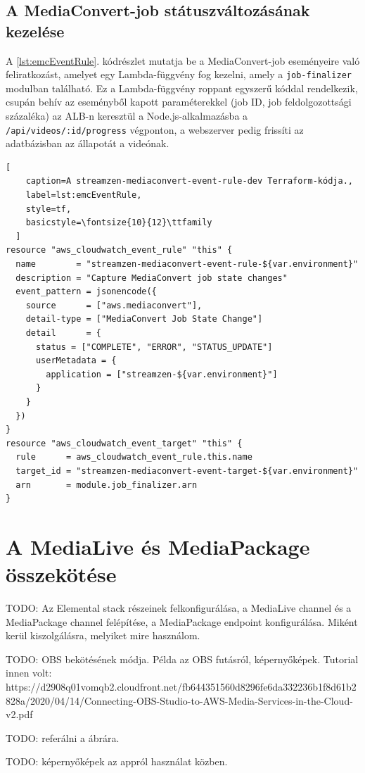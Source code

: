 \subsection{A MediaConvert-job státuszváltozásának kezelése}

A \ref{lst:emcEventRule}. kódrészlet mutatja be a MediaConvert-job eseményeire való feliratkozást, amelyet egy Lambda-függvény fog kezelni, amely a \verb|job-finalizer| modulban található. Ez a Lambda-függvény roppant egyszerű kóddal rendelkezik, csupán behív az eseményből kapott paraméterekkel (job ID, job feldolgozottsági százaléka) az ALB-n keresztül a Node.js-alkalmazásba a \verb|/api/videos/:id/progress| végponton, a webszerver pedig frissíti az adatbázisban az állapotát a videónak.

\begin{minipage}{0.92\textwidth}
  \begin{lstlisting}[
    caption=A streamzen-mediaconvert-event-rule-dev Terraform-kódja.,
    label=lst:emcEventRule,
    style=tf,
    basicstyle=\fontsize{10}{12}\ttfamily
  ]
resource "aws_cloudwatch_event_rule" "this" {
  name        = "streamzen-mediaconvert-event-rule-${var.environment}"
  description = "Capture MediaConvert job state changes"
  event_pattern = jsonencode({
    source      = ["aws.mediaconvert"],
    detail-type = ["MediaConvert Job State Change"]
    detail      = {
      status = ["COMPLETE", "ERROR", "STATUS_UPDATE"]
      userMetadata = {
        application = ["streamzen-${var.environment}"]
      }
    }
  })
}
resource "aws_cloudwatch_event_target" "this" {
  rule      = aws_cloudwatch_event_rule.this.name
  target_id = "streamzen-mediaconvert-event-target-${var.environment}"
  arn       = module.job_finalizer.arn
}
\end{lstlisting}
\end{minipage}

\section{A MediaLive és MediaPackage összekötése}

TODO: Az Elemental stack részeinek felkonfigurálása, a MediaLive channel és a MediaPackage channel felépítése, a MediaPackage endpoint konfigurálása. Miként kerül kiszolgálásra, melyiket mire használom.

TODO: OBS bekötésének módja. Példa az OBS futásról, képernyőképek. Tutorial innen volt: https://d2908q01vomqb2.cloudfront.net/fb644351560d8296fe6da332236b1f8d61b2828a/2020/04/14/Connecting-OBS-Studio-to-AWS-Media-Services-in-the-Cloud-v2.pdf

TODO: referálni a  ábrára.

TODO: képernyőképek az appról használat közben.
